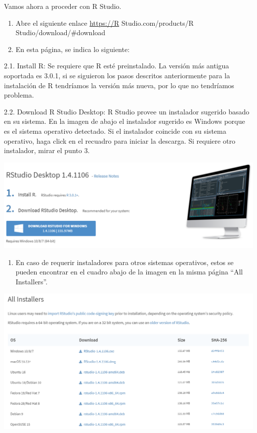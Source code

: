 \documentclass[
]{book}
\providecommand{\tightlist}{%
  \setlength{\itemsep}{0pt}\setlength{\parskip}{0pt}}
\begin{document}
Vamos ahora a proceder con R Studio.

\begin{enumerate}
\def\labelenumi{\arabic{enumi}.}
\item
  Abre el siguiente enlace \url{https://R} Studio.com/products/R Studio/download/\#download
\item
  En esta página, se indica lo siguiente:
\end{enumerate}

2.1. Install R: Se requiere que R esté preinstalado. La versión más antigua soportada es 3.0.1, si se siguieron los pasos descritos anteriormente para la instalación de R tendríamos la versión más nueva, por lo que no tendríamos problema.

2.2. Download R Studio Desktop: R Studio provee un instalador sugerido basado en su sistema. En la imagen de abajo el instalador sugerido es Windows porque es el sistema operativo detectado. Si el instalador coincide con su sistema operativo, haga click en el recuadro para iniciar la descarga. Si requiere otro instalador, mirar el punto 3.

\includegraphics{data/R01.png}

\begin{enumerate}
\def\labelenumi{\arabic{enumi}.}
\setcounter{enumi}{2}
\tightlist
\item
  En caso de requerir instaladores para otros sistemas operativos, estos se pueden encontrar en el cuadro abajo de la imagen en la misma página ``All Installers''.
\end{enumerate}

\includegraphics{data/R02.png}
\end{document}
